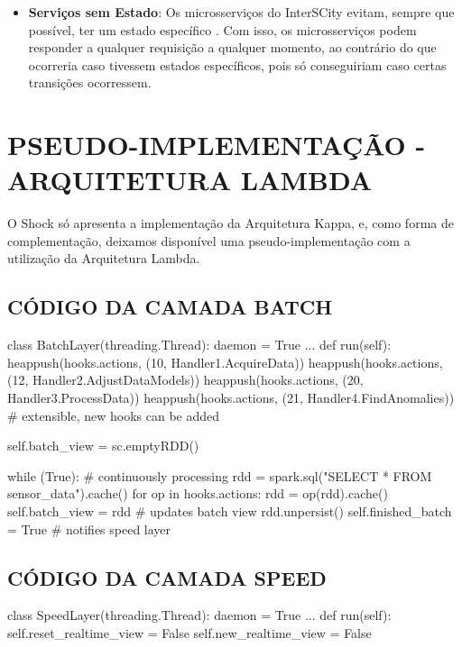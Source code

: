 \begin{apendicesenv}
\begin{itemize}
    \item \textbf{Serviços sem Estado}: Os microsserviços do InterSCity evitam,
sempre que possível, ter um estado específico \cite{delesposte2017}. Com isso,
os microsserviços podem responder a qualquer requisição a qualquer momento, ao
contrário do que ocorreria caso tivessem estados específicos, pois só
conseguiriam caso certas transições ocorressem.
\end{itemize}

\chapter{PSEUDO-IMPLEMENTAÇÃO - ARQUITETURA LAMBDA}

O Shock só apresenta a implementação da Arquitetura Kappa, e, como forma de
complementação, deixamos disponível uma pseudo-implementação com a utilização
da Arquitetura Lambda.

\label{appendix:impl}

\section{CÓDIGO DA CAMADA BATCH}
\begin{python}
class BatchLayer(threading.Thread):
    daemon = True
    ...
    def run(self):
        heappush(hooks.actions, (10, Handler1.AcquireData))
        heappush(hooks.actions, (12, Handler2.AdjustDataModels))
        heappush(hooks.actions, (20, Handler3.ProcessData))
        heappush(hooks.actions, (21, Handler4.FindAnomalies))
        # extensible, new hooks can be added

        self.batch_view = sc.emptyRDD()

        while (True):
            # continuously processing
            rdd = spark.sql("SELECT * FROM sensor_data").cache()
                for op in hooks.actions:
                rdd = op(rdd).cache()
            self.batch_view = rdd # updates batch view
            rdd.unpersist()
            self.finished_batch = True # notifies speed layer
\end{python}

\section{CÓDIGO DA CAMADA SPEED}
\begin{python}
class SpeedLayer(threading.Thread):
    daemon = True
    ...
    def run(self):
        self.reset_realtime_view = False
        self.new_realtime_view = False


\end{python}
\end{apendicesenv}
